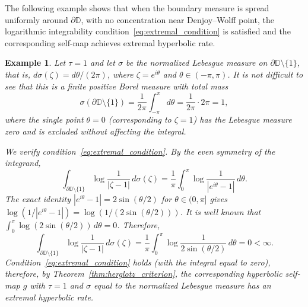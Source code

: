 \documentclass[10pt,a4paper]{amsart}
\numberwithin{equation}{section}
\newtheorem{example}[equation]{Example}
\begin{document}
The following example shows that when the boundary measure
is spread uniformly around $\partial\mathbb{D}$, with no
concentration near Denjoy--Wolff point, the logarithmic
integrability condition~\eqref{eq:extremal_condition} is
satisfied and the corresponding self-map achieves extremal
hyperbolic rate.
\begin{example}
\label{ex:uniform}
Let $\tau=1$ and let $\sigma$ be the normalized Lebesgue measure
on $\partial\mathbb{D}\setminus\{1\}$, that is,
$d\sigma(\zeta)=d\theta/(2\pi)$, where $\zeta=e^{i\theta}$ and
$\theta\in(-\pi,\pi)$.
It is not difficult to see that this is a finite positive Borel measure with total mass
\begin{equation*}
\sigma(\partial\mathbb{D}\setminus\{1\})
=\frac{1}{2\pi}\int_{-\pi}^{\pi}d\theta
=\frac{1}{2\pi}\cdot 2\pi=1,
\end{equation*}
where the single point $\theta=0$ (corresponding to
$\zeta=1$) has the Lebesgue measure zero and is excluded
without affecting the integral.

We verify condition~\eqref{eq:extremal_condition}.
By the even symmetry of the integrand,
\begin{equation*}
\int_{\partial\mathbb{D}\setminus\{1\}}
\log\frac{1}{|\zeta-1|}\,d\sigma(\zeta)
=\frac{1}{\pi}\int_0^{\pi}
\log\frac{1}{|e^{i\theta}-1|}\,d\theta.
\end{equation*}
The exact identity $|e^{i\theta}-1|=2\sin(\theta/2)$
for $\theta\in(0,\pi]$ gives
$\log(1/|e^{i\theta}-1|)=\log(1/(2\sin(\theta/2)))$.
It is well known that
$\int_0^\pi\log(2\sin(\theta/2))\,d\theta=0$. Therefore,
\begin{equation*}
\int_{\partial\mathbb{D}\setminus\{1\}}
\log\frac{1}{|\zeta-1|}\,d\sigma(\zeta)
=\frac{1}{\pi}\int_0^\pi\log\frac{1}{2\sin(\theta/2)}\,d\theta
=0<\infty.
\end{equation*}
Condition~\eqref{eq:extremal_condition} holds (with the integral equal to zero), therefore, by
Theorem~\ref{thm:herglotz_criterion}, the corresponding hyperbolic self-map $g$
with $\tau=1$ and $\sigma$ equal to the normalized Lebesgue measure has an extremal hyperbolic rate.
\end{example}
\end{document}
